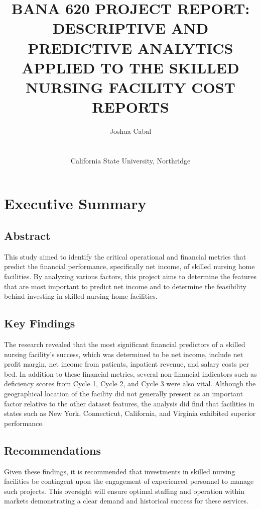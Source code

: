 \documentclass{article}
\title{\textbf{BANA 620 PROJECT REPORT: DESCRIPTIVE AND PREDICTIVE ANALYTICS APPLIED TO THE SKILLED NURSING FACILITY COST REPORTS}}
\author{Joshua Cabal \\ \\ \\California State University, Northridge \\}
\theoremstyle{mytheoremstyle}
\theoremstyle{mytheoremstyle}
\theoremstyle{myproblemstyle}
\begin{document}
    \maketitle
    \pagebreak
    \tableofcontents    
    \newpage


\section{Executive Summary}

\subsection{Abstract}

This study aimed to identify the critical operational and financial metrics that predict the financial performance, specifically net income, of skilled nursing home facilities. By analyzing various factors, this project aims to determine the features that are most important to predict net income and to determine the feasibility behind investing in skilled nursing home facilities.

\subsection{Key Findings}

The research revealed that the most significant financial predictors of a skilled nursing facility's success, which was determined to be net income, include net profit margin, net income from patients, inpatient revenue, and salary costs per bed. In addition to these financial metrics, several non-financial indicators such as deficiency scores from Cycle 1, Cycle 2, and Cycle 3 were also vital. Although the geographical location of the facility did not generally present as an important factor relative to the other dataset features, the analysis did find that facilities in states such as New York, Connecticut, California, and Virginia exhibited superior performance.

\subsection{Recommendations}

Given these findings, it is recommended that investments in skilled nursing facilities be contingent upon the engagement of experienced personnel to manage such projects. This oversight will ensure optimal staffing and operation within markets demonstrating a clear demand and historical success for these services.
\end{document}
